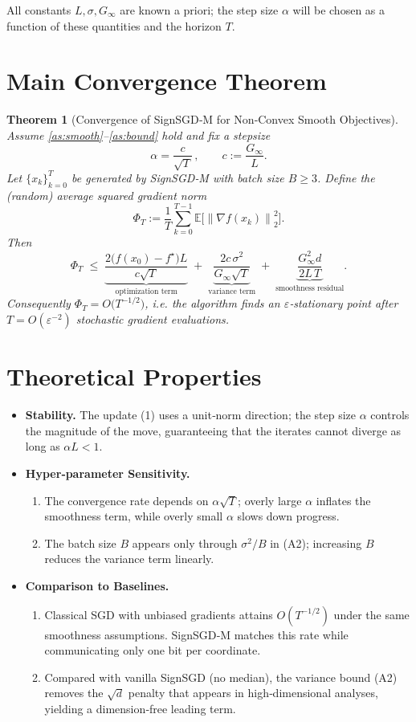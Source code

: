 \documentclass{article}
\newtheorem{theorem}{Theorem}
\newcommand{\EE}{\mathbb{E}}
\newcommand{\norm}[1]{\left\lVert#1\right\rVert}
\begin{document}
All constants $L,\sigma,G_{\infty}$ are known a priori; the step size $\alpha$ will be chosen
as a function of these quantities and the horizon $T$.

\section*{Main Convergence Theorem}
\begin{theorem}[Convergence of SignSGD‑M for Non‑Convex Smooth Objectives]\label{thm:main}
Assume \ref{as:smooth}–\ref{as:bound} hold and fix a stepsize
\[
\alpha = \frac{c}{\sqrt{T}}\,,\qquad 
c:=\frac{G_{\infty}}{L}.
\tag{2}
\]
Let $\{x_{k}\}_{k=0}^{T}$ be generated by SignSGD‑M with batch size $B\ge 3$.
Define the (random) average squared gradient norm
\[
\Phi_{T}:=\frac{1}{T}\sum_{k=0}^{T-1}\EE\!\bigl[\norm{\nabla f(x_{k})}_{2}^{2}\bigr].
\]
Then
\[
\Phi_{T}\;\le\;
\underbrace{\frac{2\bigl(f(x_{0})-f^{\star}\bigr)L}{c\sqrt{T}}}_{\text{optimization term}}
\;+\;
\underbrace{\frac{2c\,\sigma^{2}}{G_{\infty}\sqrt{T}}}_{\text{variance term}}
\;+\;
\underbrace{\frac{G_{\infty}^{2}d}{2L\,T}}_{\text{smoothness residual}} .
\tag{3}
\]
Consequently $\Phi_{T}=O\!\bigl(T^{-1/2}\bigr)$, i.e. the algorithm finds an
$\varepsilon$‑stationary point after $T=O(\varepsilon^{-2})$ stochastic gradient evaluations.
\end{theorem}

\section*{Theoretical Properties}
\begin{itemize}
\item \textbf{Stability.} The update (1) uses a unit‑norm direction; the step size $\alpha$ controls the magnitude of the move, guaranteeing that the iterates cannot diverge as long as $\alpha L<1$.
\item \textbf{Hyper‑parameter Sensitivity.}
    \begin{enumerate}[label=\alph*)]
    \item The convergence rate depends on $\alpha\sqrt{T}$; overly large $\alpha$ inflates the smoothness term, while overly small $\alpha$ slows down progress.
    \item The batch size $B$ appears only through $\sigma^{2}/B$ in (A2); increasing $B$ reduces the variance term linearly.
    \end{enumerate}
\item \textbf{Comparison to Baselines.}
    \begin{enumerate}[label=\alph*)]
    \item Classical SGD with unbiased gradients attains $O(T^{-1/2})$ under the same smoothness assumptions.  SignSGD‑M matches this rate while communicating only one bit per coordinate.
    \item Compared with vanilla SignSGD (no median), the variance bound (A2) removes the $\sqrt{d}$ penalty that appears in high‑dimensional analyses, yielding a dimension‑free leading term.
    \end{enumerate}
\end{itemize}
\end{document}
